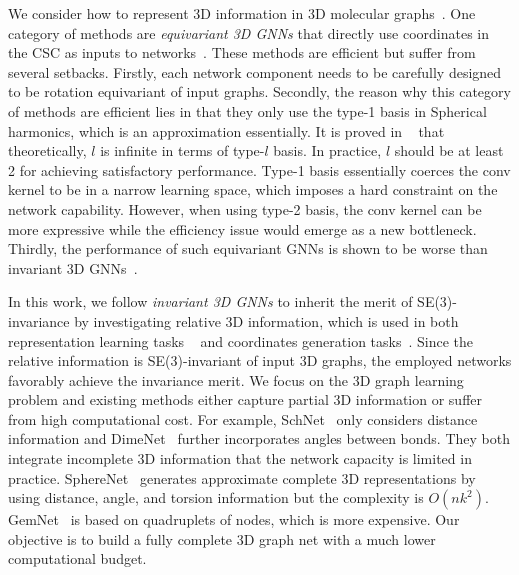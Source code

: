 \documentclass{article}
\begin{document}
We consider how to represent 3D information in 3D molecular graphs~\citep{atz2021geometric,bronstein2021geometric}.
One category of methods are \textit{equivariant 3D GNNs} that directly use coordinates in the CSC as inputs to  networks~\citep{thomas2018tensor,anderson2019cormorant,fuchs2020se,schutt2021equivariant,batzner2021se}. 
These methods are efficient but suffer from several setbacks.
Firstly, each network component needs to be carefully designed to be rotation equivariant of input graphs. 
Secondly, the reason why this category of methods are efficient lies in that they only use the type-1 basis in Spherical harmonics, which is an approximation essentially. It is proved in ~\citep{thomas2018tensor} that theoretically, $l$ is infinite in terms of type-$l$ basis. In practice, $l$ should be at least 2 for achieving satisfactory performance. Type-1 basis essentially coerces the conv kernel to be in a narrow learning space, which imposes a hard constraint on the network capability.
However, when using type-2 basis, the conv kernel can be more expressive while the efficiency issue
would emerge as a new bottleneck.
Thirdly, the performance of such equivariant GNNs is
shown to be worse than invariant 3D GNNs~\citep{liu2022spherical}.


In this work, we follow \textit{invariant 3D GNNs} to inherit the merit of SE(3)-invariance by investigating
relative 3D information, which is used in both representation learning tasks
~\citep{schutt2017schnet,klicpera_dimenet_2020,klicpera_dimenetpp_2020,shuaibi2021rotation,liu2022spherical,klicpera2021gemnet}
and coordinates generation tasks~\citep{ganea2021geomol,Simm2020Reinforcement,Simm2021SymmetryAware,xu2021molecule3d,jumper2021highly,baek2021accurate}.
Since the relative information is SE(3)-invariant of input 3D graphs, the employed networks favorably achieve the invariance merit.
We focus on the 3D graph learning problem and existing methods either capture partial 3D information or suffer from high computational cost.
For example, SchNet~\cite{schutt2017schnet} only considers distance information and  DimeNet~\cite{klicpera_dimenet_2020} further incorporates angles between bonds. They both integrate incomplete 3D information that the network capacity is limited in practice.
SphereNet~\cite{liu2022spherical} generates approximate complete 3D representations by using
distance, angle, and torsion information but the complexity is $O(nk^2)$.
GemNet~\cite{klicpera2021gemnet} is based on quadruplets of nodes, which is more expensive. Our objective is to build a fully complete 3D graph net with a much lower computational budget.
\end{document}
